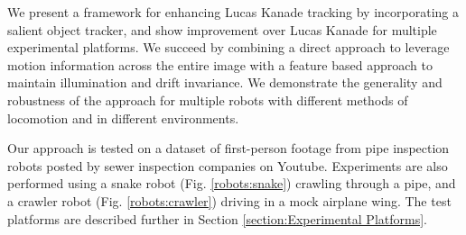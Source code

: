 \documentclass[letterpaper, 10 pt, conference]{ieeeconf}
\begin{document}
We present a framework for enhancing Lucas Kanade tracking by incorporating a salient object tracker, and show improvement over Lucas Kanade for multiple experimental platforms. We succeed by combining a direct approach to leverage motion information across the entire image with a feature based approach to maintain illumination and drift invariance. We demonstrate the generality and robustness of the approach for multiple robots with different methods of locomotion and in different environments.

Our approach is tested on a dataset of first-person footage from pipe inspection robots posted by sewer inspection companies on Youtube. Experiments are also performed using a snake robot (Fig. \ref{robots:snake}) crawling through a pipe, and a crawler robot (Fig. \ref{robots:crawler}) driving in a mock airplane wing. The test platforms are described further in Section \ref{section:Experimental Platforms}.
\end{document}

